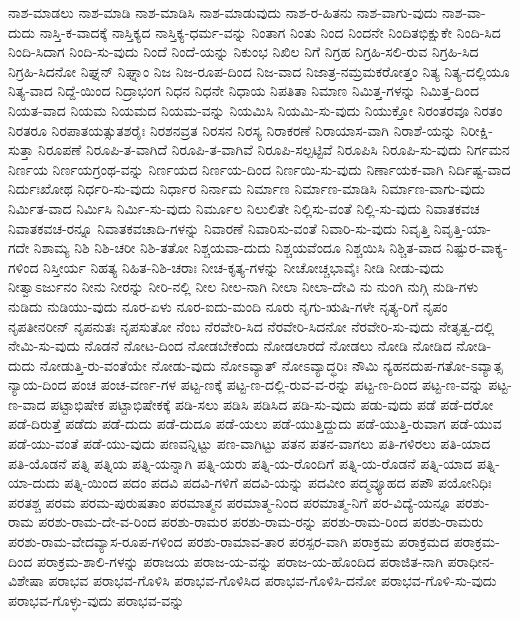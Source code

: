 {ನಾಶ-ಮಾಡಲು
ನಾಶ-ಮಾಡಿ
ನಾಶ-ಮಾಡಿಸಿ
ನಾಶ-ಮಾಡುವುದು
ನಾಶ-ರ-ಹಿತನು
ನಾಶ-ವಾಗು-ವುದು
ನಾಶ-ವಾ-ದುದು
ನಾಸ್ತಿ-ಕ-ವಾದಕ್ಕೆ
ನಾಸ್ತಿಕ್ಯದ
ನಾಸ್ತಿಕ್ಯ-ಧರ್ಮ-ವನ್ನು
ನಿಂತಾಗ
ನಿಂತು
ನಿಂದ
ನಿಂದನೇ
ನಿಂದಿತಭಿಕ್ಷುಕೇ
ನಿಂದಿ-ಸಿದ
ನಿಂದಿ-ಸಿದಾಗ
ನಿಂದಿ-ಸು-ವುದು
ನಿಂದೆ
ನಿಂದೆ-ಯನ್ನು
ನಿಕುಂಭ
ನಿಖಿಲ
ನಿಗೆ
ನಿಗ್ರಹ
ನಿಗ್ರಹಿ-ಸಲಿ-ರುವ
ನಿಗ್ರಹಿ-ಸಿದ
ನಿಗ್ರಹಿ-ಸಿದನೋ
ನಿಘ್ನನ್
ನಿಘ್ನಾಂ
ನಿಜ
ನಿಜ-ರೂಪ-ದಿಂದ
ನಿಜ-ವಾದ
ನಿಜಾತ್ರ-ನಮ್ರಮಕರೋತ್ತಂ
ನಿತ್ಯ
ನಿತ್ಯ-ದಲ್ಲಿಯೂ
ನಿತ್ಯ-ವಾದ
ನಿದ್ದೆ-ಯಿಂದ
ನಿದ್ರಾಭಂಗ
ನಿಧನ
ನಿಧನೇ
ನಿಧಾಯ
ನಿಪತಿತಾ
ನಿಮಾಣ
ನಿಮಿತ್ತ-ಗಳನ್ನು
ನಿಮಿತ್ತ-ದಿಂದ
ನಿಯತ-ವಾದ
ನಿಯಮ
ನಿಯಮದ
ನಿಯಮ-ವನ್ನು
ನಿಯಮಿಸಿ
ನಿಯಮಿ-ಸು-ವುದು
ನಿಯುಕ್ತೋ
ನಿರಂತರವೂ
ನಿರತಂ
ನಿರತರೂ
ನಿರಪಾತಯತ್ಸುತಶರೈಃ
ನಿರಶನವ್ರತ
ನಿರಸನ
ನಿರಸ್ಯ
ನಿರಾಕರಣೆ
ನಿರಾಯಾಸ-ವಾಗಿ
ನಿರಾಶೆ-ಯನ್ನು
ನಿರೀಕ್ಷಿ-ಸುತ್ತಾ
ನಿರೂಪಣೆ
ನಿರೂಪಿ-ತ-ವಾಗಿದೆ
ನಿರೂಪಿ-ತ-ವಾಗಿವೆ
ನಿರೂಪಿ-ಸಲ್ಪಟ್ಟಿವೆ
ನಿರೂಪಿಸಿ
ನಿರೂಪಿ-ಸು-ವುದು
ನಿರ್ಗಮನ
ನಿರ್ಣಯ
ನಿರ್ಣಯಗ್ರಂಥ-ವನ್ನು
ನಿರ್ಣಯದ
ನಿರ್ಣಯ-ದಿಂದ
ನಿರ್ಣಯಿ-ಸು-ವುದು
ನಿರ್ಣಾಯಕ-ವಾಗಿ
ನಿರ್ದಿಷ್ಟ-ವಾದ
ನಿರ್ದುಃಖೋಥ
ನಿರ್ಧರಿ-ಸು-ವುದು
ನಿರ್ಧಾರ
ನಿರ್ನಾಮ
ನಿರ್ಮಾಣ
ನಿರ್ಮಾಣ-ಮಾಡಿಸಿ
ನಿರ್ಮಾಣ-ವಾಗು-ವುದು
ನಿರ್ಮಿತ-ವಾದ
ನಿರ್ಮಿಸಿ
ನಿರ್ಮಿ-ಸು-ವುದು
ನಿರ್ಮೂಲ
ನಿಲುಲಿತೇ
ನಿಲ್ಲಿಸು-ವಂತೆ
ನಿಲ್ಲಿ-ಸು-ವುದು
ನಿವಾತಕವಚ
ನಿವಾತಕವಚ-ರನ್ನೂ
ನಿವಾತಕವಚಾದಿ-ಗಳನ್ನು
ನಿವಾರಣೆ
ನಿವಾರಿಸು-ವಂತೆ
ನಿವಾರಿ-ಸು-ವುದು
ನಿವೃತ್ತಿ
ನಿವೃತ್ತಿ-ಯಾ-ಗದೇ
ನಿಶಾಮ್ಯ
ನಿಶಿ
ನಿಶಿ-ಚರೀ
ನಿಶಿ-ತತೋ
ನಿಶ್ಚಯವಾ-ದುದು
ನಿಶ್ಚಯವೆಂದೂ
ನಿಶ್ಚಯಿಸಿ
ನಿಶ್ಚಿತ-ವಾದ
ನಿಷ್ಟುರ-ವಾಕ್ಯ-ಗಳಿಂದ
ನಿಸ್ತೀರ್ಯ
ನಿಹತ್ಯ
ನಿಹಿತ-ನಿಶಿ-ಚರಾಃ
ನೀಚ-ಕೃತ್ಯ-ಗಳನ್ನು
ನೀಚೋಚ್ಚಭಾವೈಃ
ನೀಡಿ
ನೀಡು-ವುದು
ನೀತ್ವಾಽರ್ಜುನಂ
ನೀನು
ನೀರನ್ನು
ನೀರಿ-ನಲ್ಲಿ
ನೀಲ
ನೀಲ-ನಾಗಿ
ನೀಲಾ
ನೀಲಾ-ದೇವಿ
ನು
ನುಂಗಿ
ನುಗ್ಗಿ
ನುಡಿ-ಗಳು
ನುಡಿದು
ನುಡಿಯು-ವುದು
ನೂರ-ಏಳು
ನೂರ-ಐದು-ಮಂದಿ
ನೂರು
ನೃಗು-ಋಷಿ-ಗಳೇ
ನೃತ್ಯ-ರಿಗೆ
ನೃಪಂ
ನೃಪತೀನರೀನ್
ನೃಪನುತಃ
ನೃಪಸುತೋ
ನೆಂಬ
ನೆರವೇರಿ-ಸಿದ
ನೆರವೇರಿ-ಸಿದನೋ
ನೆರವೇರಿ-ಸು-ವುದು
ನೇತೃತ್ವ-ದಲ್ಲಿ
ನೇಮಿ-ಸು-ವುದು
ನೊಡನೆ
ನೋಟ-ದಿಂದ
ನೋಡಬೇಕೆಂದು
ನೋಡಲಾರದೆ
ನೋಡಲು
ನೋಡಿ
ನೋಡಿದ
ನೋಡಿ-ದುದು
ನೋಡುತ್ತಿ-ರು-ವಂತೆಯೇ
ನೋಡು-ವುದು
ನೋಽವ್ಯಾತ್
ನೋಽವ್ಯಾದ್ಧರಿಃ
ನೌಮಿ
ನ್ಯಹನದುಪ-ಗತೋ-ಽವ್ಯಾತ್ಸ
ನ್ಯಾಯ-ದಿಂದ
ಪಂಚ
ಪಂಚ-ವರ್ಣ-ಗಳ
ಪಟ್ಟ-ಣಕ್ಕೆ
ಪಟ್ಟ-ಣ-ದಲ್ಲಿ-ರುವ-ವ-ರನ್ನು
ಪಟ್ಟ-ಣ-ದಿಂದ
ಪಟ್ಟ-ಣ-ವನ್ನು
ಪಟ್ಟ-ಣ-ವಾದ
ಪಟ್ಟಾಭಿಷೇಕ
ಪಟ್ಟಾಭಿಷೇಕಕ್ಕೆ
ಪಡಿ-ಸಲು
ಪಡಿಸಿ
ಪಡಿಸಿದ
ಪಡಿ-ಸು-ವುದು
ಪಡು-ವುದು
ಪಡೆ
ಪಡೆ-ದರೋ
ಪಡೆ-ದಿರುತ್ತೆ
ಪಡೆದು
ಪಡೆ-ದುದು
ಪಡೆ-ದುದೂ
ಪಡೆ-ಯಲು
ಪಡೆ-ಯುತ್ತಿದ್ದುದು
ಪಡೆ-ಯುತ್ತಿ-ರುವಾಗ
ಪಡೆ-ಯುವ
ಪಡೆ-ಯು-ವಂತೆ
ಪಡೆ-ಯು-ವುದು
ಪಣವನ್ನಿಟ್ಟು
ಪಣ-ವಾಗಿಟ್ಟು
ಪತನ
ಪತನ-ವಾಗಲು
ಪತಿ-ಗಳಿರಲು
ಪತಿ-ಯಾದ
ಪತಿ-ಯೊಡನೆ
ಪತ್ನಿ
ಪತ್ನಿಯ
ಪತ್ನಿ-ಯನ್ನಾಗಿ
ಪತ್ನಿ-ಯರು
ಪತ್ನಿ-ಯ-ರೊಂದಿಗೆ
ಪತ್ನಿ-ಯ-ರೊಡನೆ
ಪತ್ನಿ-ಯಾದ
ಪತ್ನಿ-ಯಾ-ದುದು
ಪತ್ನಿ-ಯಿಂದ
ಪದಂ
ಪದವಿ
ಪದವಿ-ಗಳಿಗೆ
ಪದವಿ-ಯನ್ನು
ಪದವೀಂ
ಪದ್ಮವ್ಯೂಹದ
ಪಪೌ
ಪಯೋನಿಧಿಃ
ಪರತಶ್ಚ
ಪರಮ
ಪರಮ-ಪುರುಷತಾಂ
ಪರಮಾತ್ಮನ
ಪರಮಾತ್ಮ-ನಿಂದ
ಪರಮಾತ್ಮ-ನಿಗೆ
ಪರ-ವಿದ್ಯೆ-ಯನ್ನೂ
ಪರಶು-ರಾಮ
ಪರಶು-ರಾಮ-ದೇ-ವ-ರಿಂದ
ಪರಶು-ರಾಮರ
ಪರಶು-ರಾಮ-ರನ್ನು
ಪರಶು-ರಾಮ-ರಿಂದ
ಪರಶು-ರಾಮರು
ಪರಶು-ರಾಮ-ವೇದವ್ಯಾಸ-ರೂಪ-ಗಳಿಂದ
ಪರಶು-ರಾಮಾವ-ತಾರ
ಪರಸ್ಪರ-ವಾಗಿ
ಪರಾಕ್ರಮ
ಪರಾಕ್ರಮದ
ಪರಾಕ್ರಮ-ದಿಂದ
ಪರಾಕ್ರಮ-ಶಾಲಿ-ಗಳನ್ನು
ಪರಾಜಯ
ಪರಾಜ-ಯ-ವನ್ನು
ಪರಾಜ-ಯ-ಹೊಂದಿದ
ಪರಾಜಿತ-ನಾಗಿ
ಪರಾಧೀನ-ವಿಶೇಷಾ
ಪರಾಭವ
ಪರಾಭವ-ಗೊಳಿಸಿ
ಪರಾಭವ-ಗೊಳಿಸಿದ
ಪರಾಭವ-ಗೊಳಿಸಿ-ದನೋ
ಪರಾಭವ-ಗೊಳಿ-ಸು-ವುದು
ಪರಾಭವ-ಗೊಳ್ಳು-ವುದು
ಪರಾಭವ-ವನ್ನು
}
